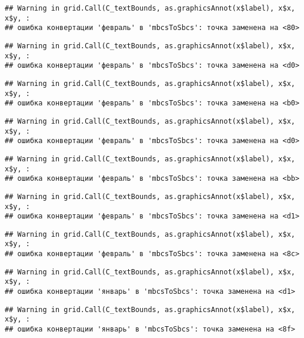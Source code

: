\documentclass[
]{article}
\begin{document}
\begin{verbatim}
## Warning in grid.Call(C_textBounds, as.graphicsAnnot(x$label), x$x, x$y, :
## ошибка конвертации 'февраль' в 'mbcsToSbcs': точка заменена на <80>
\end{verbatim}

\begin{verbatim}
## Warning in grid.Call(C_textBounds, as.graphicsAnnot(x$label), x$x, x$y, :
## ошибка конвертации 'февраль' в 'mbcsToSbcs': точка заменена на <d0>
\end{verbatim}

\begin{verbatim}
## Warning in grid.Call(C_textBounds, as.graphicsAnnot(x$label), x$x, x$y, :
## ошибка конвертации 'февраль' в 'mbcsToSbcs': точка заменена на <b0>
\end{verbatim}

\begin{verbatim}
## Warning in grid.Call(C_textBounds, as.graphicsAnnot(x$label), x$x, x$y, :
## ошибка конвертации 'февраль' в 'mbcsToSbcs': точка заменена на <d0>
\end{verbatim}

\begin{verbatim}
## Warning in grid.Call(C_textBounds, as.graphicsAnnot(x$label), x$x, x$y, :
## ошибка конвертации 'февраль' в 'mbcsToSbcs': точка заменена на <bb>
\end{verbatim}

\begin{verbatim}
## Warning in grid.Call(C_textBounds, as.graphicsAnnot(x$label), x$x, x$y, :
## ошибка конвертации 'февраль' в 'mbcsToSbcs': точка заменена на <d1>
\end{verbatim}

\begin{verbatim}
## Warning in grid.Call(C_textBounds, as.graphicsAnnot(x$label), x$x, x$y, :
## ошибка конвертации 'февраль' в 'mbcsToSbcs': точка заменена на <8c>
\end{verbatim}

\begin{verbatim}
## Warning in grid.Call(C_textBounds, as.graphicsAnnot(x$label), x$x, x$y, :
## ошибка конвертации 'январь' в 'mbcsToSbcs': точка заменена на <d1>
\end{verbatim}

\begin{verbatim}
## Warning in grid.Call(C_textBounds, as.graphicsAnnot(x$label), x$x, x$y, :
## ошибка конвертации 'январь' в 'mbcsToSbcs': точка заменена на <8f>
\end{verbatim}
\end{document}
